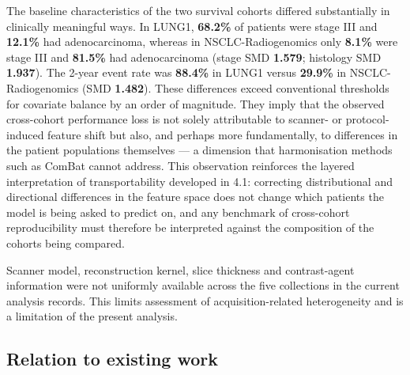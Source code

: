 \documentclass[a4paper,fleqn]{cas-sc}
\begin{document}
The baseline characteristics of the two survival cohorts differed substantially in clinically meaningful ways. In LUNG1, \textbf{68.2\%} of patients were stage III and \textbf{12.1\%} had adenocarcinoma, whereas in NSCLC-Radiogenomics only \textbf{8.1\%} were stage III and \textbf{81.5\%} had adenocarcinoma (stage SMD \textbf{1.579}; histology SMD \textbf{1.937}). The 2-year event rate was \textbf{88.4\%} in LUNG1 versus \textbf{29.9\%} in NSCLC-Radiogenomics (SMD \textbf{1.482}). These differences exceed conventional thresholds for covariate balance by an order of magnitude. They imply that the observed cross-cohort performance loss is not solely attributable to scanner- or protocol-induced feature shift but also, and perhaps more fundamentally, to differences in the patient populations themselves --- a dimension that harmonisation methods such as ComBat cannot address. This observation reinforces the layered interpretation of transportability developed in 4.1: correcting distributional and directional differences in the feature space does not change which patients the model is being asked to predict on, and any benchmark of cross-cohort reproducibility must therefore be interpreted against the composition of the cohorts being compared.

Scanner model, reconstruction kernel, slice thickness and contrast-agent information were not uniformly available across the five collections in the current analysis records. This limits assessment of acquisition-related heterogeneity and is a limitation of the present analysis.

\subsection{Relation to existing work}
\end{document}
